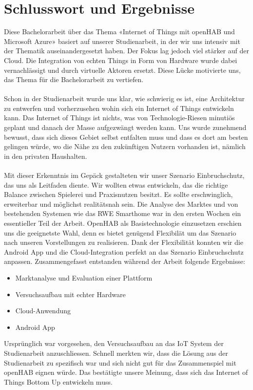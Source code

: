 \section{Schlusswort und Ergebnisse}

Diese Bachelorarbeit über das Thema «Internet of Things mit openHAB und Microsoft Azure» basiert auf unserer Studienarbeit, in der wir uns intensiv mit der Thematik auseinandergesetzt haben. Der Fokus lag jedoch viel stärker auf der Cloud. Die Integration von echten Things in Form von Hardware wurde dabei vernachlässigt und durch virtuelle Aktoren ersetzt. Diese Lücke motivierte uns, das Thema für die Bachelorarbeit zu vertiefen.\\ \\
Schon in der Studienarbeit wurde uns klar, wie schwierig es ist, eine Architektur zu entwerfen und vorherzusehen wohin sich ein Internet of Things entwickeln kann. Das Internet of Things ist nichts, was von Technologie-Riesen minutiös geplant und danach der Masse aufgezwängt werden kann. Uns wurde zunehmend bewusst, dass sich dieses Gebiet selbst entfalten muss und dass es dort am besten gelingen würde, wo die Nähe zu den zukünftigen Nutzern vorhanden ist, nämlich in den privaten Haushalten.\\ \\
Mit dieser Erkenntnis im Gepäck gestalteten wir unser Szenario Einbruchschutz, das uns als Leitfaden diente. Wir wollten etwas entwickeln, das die richtige Balance zwischen Spielerei und Praxisnutzen besitzt. Es sollte erschwinglich, erweiterbar und möglichst realitätsnah sein. Die Analyse des Marktes und von bestehenden Systemen wie das RWE Smarthome war in den ersten Wochen ein essentieller Teil der Arbeit. OpenHAB als Basistechnologie einzusetzen erschien uns die geeignetste Wahl, denn es bietet genügend Flexibilät um das Szenario nach unseren Vorstellungen zu realisieren. Dank der Flexibilität konnten wir die Android App und die Cloud-Integration perfekt an das Szenario Einbruchschutz anpassen. Zusammengefasst entstanden während der Arbeit folgende Ergebnisse:
\begin{itemize}
	\item Marktanalyse und Evaluation einer Plattform
	\item Versuchsaufbau mit echter Hardware
	\item Cloud-Anwendung
	\item Android App
\end{itemize}
Ursprünglich war vorgesehen, den Versuchsaufbau an das IoT System der Studienarbeit anzuschliessen. Schnell merkten wir, dass die Lösung aus der Studienarbeit zu spezifisch war und sich nicht gut für das Zusammenspiel mit openHAB eignen würde. Das bestätigte unsere Meinung, dass sich das Internet of Things Bottom Up entwickeln muss. 